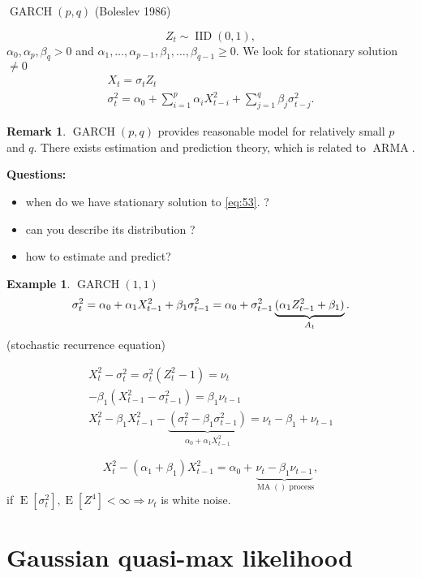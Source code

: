 \documentclass[12pt,a4paper, notitlepage]{book}
\theoremstyle{definition} %
\newtheorem{example}[definition]{Example}
\newtheorem{remark}[definition]{Remark}
\theoremstyle{plain} %
\DeclareMathOperator{\E}{E}
\DeclareMathOperator{\Iid}{IID}
\DeclareMathOperator{\Arma}{ARMA}
\DeclareMathOperator{\Ma}{MA}
\DeclareMathOperator{\Garch}{GARCH}
\begin{document}
$\Garch(p,q) $ (Boleslev 1986)

\[ Z_t \sim \Iid(0,1) , \]
$ \alpha_0, \alpha_p, \beta_q >0 $ and $ \alpha_1, \ldots , \alpha_{p-1}, \beta_1, \ldots , \beta_{q-1} \geq 0 $. 
We look for stationary solution $ \neq 0 $
\begin{align*}
X_t = \sigma_t Z_t \\
\sigma_t ^2 = \alpha_0 + \sum _{i=1}^p \alpha_i X_{t-i}^2 + \sum_{j=1}^q \beta_j \sigma_{t-j}^2 .
\end{align*}

\begin{remark}
$ \Garch(p,q) $ provides reasonable model for relatively small $ p $ and $ q $.
There exists estimation and prediction theory, which is related to $ \Arma $.
\end{remark}

{\bf Questions: }
\begin{itemize}
\item when do we have stationary solution to \ref{eq:53}. ?
\item can you describe its distribution ?
\item how to estimate and predict?
\end{itemize}

\begin{example} $ \Garch(1,1) $ 
\[ \sigma_t^2 = \alpha_0 + \alpha_1 X_{t-1}^2 + \beta_1 \sigma_{t-1}^2  \\
= \alpha_0 + \sigma_{t-1}^2 \underbrace{(\alpha_1 Z_{t-1}^2 + \beta_1) }_{ A_t} . \]
(stochastic recurrence equation)

\begin{align*}
 X_t ^2 - \sigma_t^2 = \sigma_t ^2( Z_t^2 - 1) = \nu_t \\
- \beta_1(X_{t-1}^2 - \sigma_{t-1}^2) = \beta_1 \nu_{t-1} \\
X_t^2 - \beta_1 X_{t-1}^2 -  \underbrace{ ( \sigma_t^2 - \beta_1 \sigma_{t-1}^2)}_{ \alpha_0 + \alpha_1 X_{t-1}^2} = \nu_t - \beta_1 + \nu_{t-1} 
\end{align*}


\[ X_t^2 - (\alpha_1 + \beta_1) X_{t-1}^2 = \alpha_0 + \underbrace{ \nu_t - \beta_1 \nu_{t-1} }_{\Ma() \text{ process}} , \]
if $ \E[\sigma_t^2], \E[Z^4] < \infty \Rightarrow \nu _t $ is white noise.
\end{example}

\section{Gaussian quasi-max likelihood }
\end{document}
